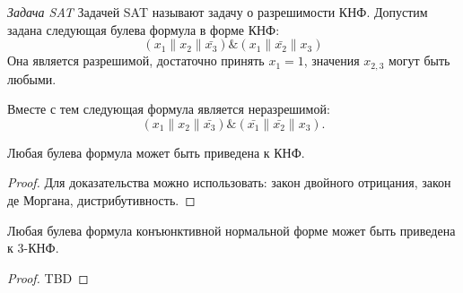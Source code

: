 \begin{example}
\emph{Задача SAT}
\label{exAddAlgoSAT}
Задачей SAT называют задачу о разрешимости КНФ. Допустим задана
следующая булева формула в форме КНФ:
\begin{equation}
\left(x_1 \| x_2 \| \bar{x_3} \right) \& \left(x_1 \| \bar{x_2} \| x_3 \right)
\nonumber
\end{equation}
Она является разрешимой, достаточно принять $x_1 = 1$, значения
$x_{2,3}$ могут быть любыми.

Вместе с тем следующая формула является неразрешимой:
\begin{equation}
\left(x_1 \| x_2 \| \bar{x_3} \right) \& 
\left(\bar{x_1} \| \bar{x_2} \| x_3 \right).
\nonumber
\end{equation}

\end{example}

\begin{theorem}
Любая булева формула может быть приведена к КНФ. 
\end{theorem}

\begin{proof}
Для доказательства можно использовать: закон двойного отрицания, закон
де Моргана, дистрибутивность.
\end{proof}

\begin{theorem}
Любая булева формула конъюнктивной нормальной форме может быть
приведена к 3-КНФ.  
\end{theorem}

\begin{proof}
TBD
\end{proof}

